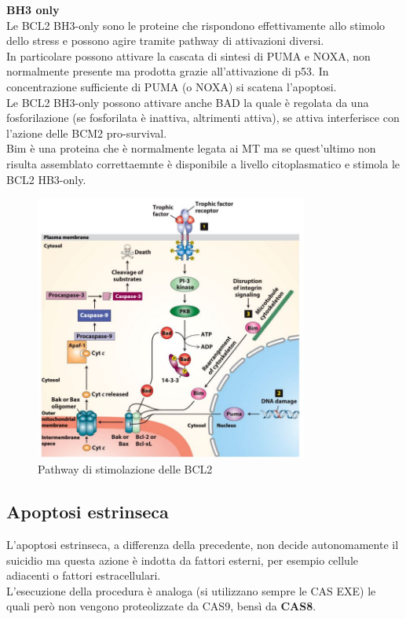             \textbf{BH3 only}\\
                Le BCL2 BH3-only sono le proteine che rispondono effettivamente allo stimolo dello stress e possono agire tramite pathway di attivazioni diversi.\\ 
                In particolare possono attivare la cascata di sintesi di PUMA e NOXA, non normalmente presente ma prodotta grazie all'attivazione di p53. In concentrazione sufficiente di PUMA (o NOXA) si scatena l'apoptosi. \\
                Le BCL2 BH3-only possono attivare anche BAD la quale è regolata da una fosforilazione (se fosforilata è inattiva, altrimenti attiva), se attiva interferisce con l'azione delle BCM2 pro-survival.\\
                Bim è una proteina che è normalmente legata ai MT ma se quest'ultimo non risulta assemblato correttaemnte è disponibile a livello citoplasmatico e stimola le BCL2 HB3-only.
                \begin{figure}[h]
                    \centering \includegraphics[width=0.8\textwidth]{images/pathway_BH3.JPG}
                    \caption{\small Pathway di stimolazione delle BCL2}            
                    \label{fig:mesh1}
                \end{figure} 
                
    \subsection{Apoptosi estrinseca}
        L'apoptosi estrinseca, a differenza della precedente, non decide autonomamente il suicidio ma questa azione è indotta da fattori esterni, per esempio cellule adiacenti o fattori estracellulari.\\
        L'esecuzione della procedura è analoga (si utilizzano sempre le CAS EXE) le quali però non vengono proteolizzate da CAS9, bensì da \textbf{CAS8}.\\
        
